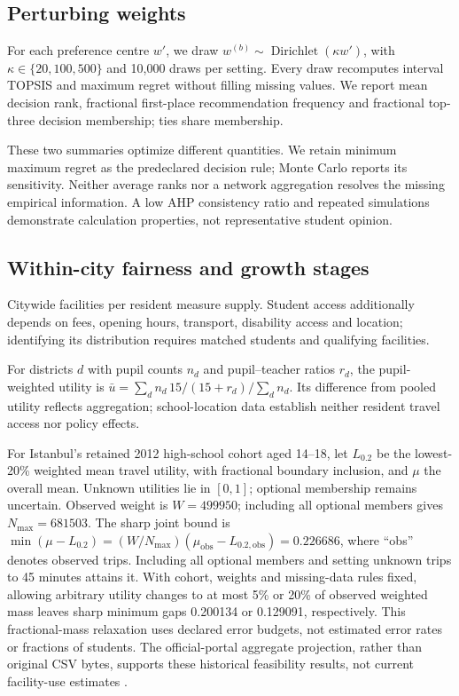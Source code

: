 \subsection{Perturbing weights}
For each preference centre $w'$, we draw
$w^{(b)}\sim\operatorname{Dirichlet}(\kappa w')$, with
$\kappa\in\{20,100,500\}$ and 10,000 draws per setting. Every draw recomputes
interval TOPSIS and maximum regret without filling missing values. We report
mean decision rank, fractional first-place recommendation frequency and
fractional top-three decision membership; ties share membership.





\MonteCarloInterpretation
These two summaries optimize different quantities. We retain minimum maximum
regret as the predeclared decision rule; Monte Carlo reports its sensitivity.
Neither average ranks nor a network aggregation resolves the missing empirical
information. A low AHP consistency ratio and repeated simulations demonstrate
calculation properties, not representative student opinion.

\subsection{Within-city fairness and growth stages}
Citywide facilities per resident measure supply. Student access additionally
depends on fees, opening hours, transport, disability access and location;
identifying its distribution requires matched students and qualifying facilities.

\EquityCase
For districts $d$ with pupil counts $n_d$ and pupil--teacher ratios $r_d$,
the pupil-weighted utility is
$\bar u=\sum_d n_d\,15/(15+r_d)/\sum_dn_d$.
Its difference from pooled utility reflects aggregation; school-location data
establish neither resident travel access nor policy effects.

For Istanbul's retained 2012 high-school cohort aged 14--18, let $L_{0.2}$
be the lowest-20\% weighted mean travel utility, with fractional boundary
inclusion, and $\mu$ the overall mean. Unknown utilities lie in $[0,1]$; optional membership remains uncertain. Observed weight is $W=499950$; including all
optional members gives $N_{\max}=681503$. The sharp joint bound is
$\min(\mu-L_{0.2})=(W/N_{\max})(\mu_{\mathrm{obs}}-L_{0.2,\mathrm{obs}})=0.226686$,
where ``obs'' denotes observed trips.
Including all optional members and setting unknown trips to 45 minutes attains it.
With cohort, weights and missing-data rules fixed, allowing arbitrary utility
changes to at most 5\% or 20\% of observed weighted mass leaves sharp minimum gaps
0.200134 or 0.129091, respectively. This fractional-mass relaxation uses declared
error budgets, not estimated error rates or fractions of students.
The official-portal aggregate projection, rather than original CSV bytes,
supports these historical feasibility results, not current facility-use estimates
\cite{istanbul}.

